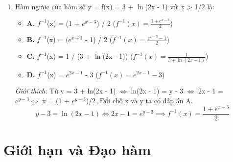 \documentclass[11pt,a4paper,oneside]{book}
\begin{document}
\begin{enumerate}[label=\textbf{Câu \arabic*:}, leftmargin=2.2em, itemsep=8pt]
  \[ f(-x) = \ln\left(\sqrt{x^2+1} - x\right) = \ln\left(\frac{1}{\sqrt{x^2+1}+x}\right) = -f(x) \]
  \item Hàm ngược của hàm số y = f(x) = 3 + $\ln$(2x - 1) với x > 1/2 là:
  \begin{itemize}[label={}, leftmargin=1em, itemsep=2pt]
    \item \textbf{A.} $f^{-1}$(x) = (1 + $e^{x - 3}$) / 2 \quad ($f^{-1}(x) = \frac{1 + e^{x-3}}{2}$)
    \item \textbf{B.} $f^{-1}$(x) = $(e^{x + 3}$ - 1) / 2 \quad ($f^{-1}(x) = \frac{e^{x+3} - 1}{2}$)
    \item \textbf{C.} $f^{-1}$(x) = 1 / (3 + $\ln$(2x - 1)) \quad ($f^{-1}(x) = \frac{1}{3 + \ln(2x-1)}$)
    \item \textbf{D.} $f^{-1}$(x) = $e^{2x - 1}$ - 3 \quad ($f^{-1}(x) = e^{2x-1} - 3$)
  \end{itemize}
  \vspace{2pt}
   \textit{Giải thích:} Từ y = 3 + ln(2x - 1) $\iff$  ln(2x - 1) = y - 3 $\iff$  2x - 1 = $e^{y - 3} \iff$  x = (1 + $e^{y - 3}$)/2. Đổi chỗ x và y ta có đáp án A.
  \[ y - 3 = \ln(2x-1) \iff 2x - 1 = e^{y-3} \implies f^{-1}(x) = \frac{1 + e^{x-3}}{2} \]
\end{enumerate}

\chapter{Giới hạn và Đạo hàm}
\label{chap:chuong-2}
\end{document}
